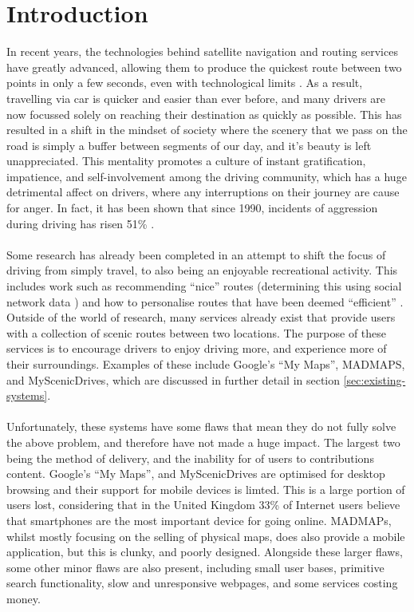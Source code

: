 \section{Introduction}
In recent years, the technologies behind satellite navigation and routing services have greatly advanced, allowing them to produce the quickest route between two points in only a few seconds, even with technological limits \cite{lou2009map}. As a result, travelling via car is quicker and easier than ever before, and many drivers are now focussed solely on reaching their destination as quickly as possible. This has resulted in a shift in the mindset of society where the scenery that we pass on the road is simply a buffer between segments of our day, and it's beauty is left unappreciated. This mentality promotes a  culture of instant gratification, impatience, and self-involvement among the driving community, which has a huge detrimental affect on drivers, where any interruptions on their journey are cause for anger. In fact, it has been shown that since 1990, incidents of aggression during driving has risen 51\% \cite{vest1997road}. \ \\
\ \\
Some research has already been completed in an attempt to shift the focus of driving from simply travel, to also being an enjoyable recreational activity. This includes work such as recommending ``nice'' routes (determining this using social network data \cite{peregrino2012mapping}\cite{van2011time}) and how to personalise routes that have been deemed ``efficient'' \cite{chen2011discovering}. Outside of the world of research, many services already exist that provide users with a collection of scenic routes between two locations. The purpose of these services is to encourage drivers to enjoy driving more, and experience more of their surroundings. Examples of these include Google's ``My Maps''\cite{url2015gmaps}, MADMAPS\cite{url2015madmaps}, and MyScenicDrives\cite{url2015myscenicdrives}, which are discussed in further detail in section \ref{sec:existing-systems}.\ \\
\ \\
Unfortunately, these systems have some flaws that mean they do not fully solve the above problem, and therefore have not made a huge impact. The largest two being the method of delivery, and the inability for of users to contributions content. Google's ``My Maps'', and MyScenicDrives are optimised for desktop browsing and their support for mobile devices is limted. This is a large portion of users lost, considering that in the United Kingdom 33\% of Internet users believe that smartphones are the most important device for going online\cite{ofcom2015comms}. MADMAPs, whilst mostly focusing on the selling of physical maps, does also provide a mobile application, but this is clunky, and poorly designed. Alongside these larger flaws, some other minor flaws are also present, including small user bases, primitive search functionality, slow and unresponsive webpages, and some services costing money.\ \\
